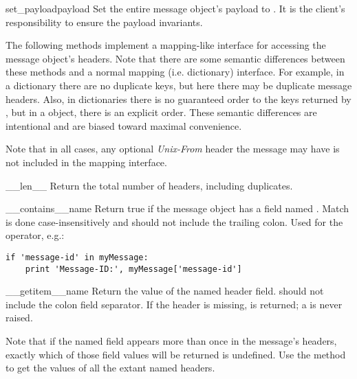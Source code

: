 \begin{methoddesc}[Message]{set_payload}{payload}
Set the entire message object's payload to .  It is the
client's responsibility to ensure the payload invariants.
\end{methoddesc}

The following methods implement a mapping-like interface for accessing
the message object's  headers.  Note that there are some
semantic differences between these methods and a normal mapping
(i.e. dictionary) interface.  For example, in a dictionary there are
no duplicate keys, but here there may be duplicate message headers.  Also,
in dictionaries there is no guaranteed order to the keys returned by
, but in a  object, there is an explicit
order.  These semantic differences are intentional and are biased
toward maximal convenience.

Note that in all cases, any optional \emph{Unix-From} header the message
may have is not included in the mapping interface.

\begin{methoddesc}[Message]{__len__}{}
Return the total number of headers, including duplicates.
\end{methoddesc}

\begin{methoddesc}[Message]{__contains__}{name}
Return true if the message object has a field named .
Match is done case-insensitively and  should not include the
trailing colon.  Used for the  operator,
e.g.:

\begin{verbatim}
if 'message-id' in myMessage:
    print 'Message-ID:', myMessage['message-id']
\end{verbatim}
\end{methoddesc}

\begin{methoddesc}[Message]{__getitem__}{name}
Return the value of the named header field.   should not
include the colon field separator.  If the header is missing,
 is returned; a  is never raised.

Note that if the named field appears more than once in the message's
headers, exactly which of those field values will be returned is
undefined.  Use the  method to get the values of all
the extant named headers.
\end{methoddesc}


